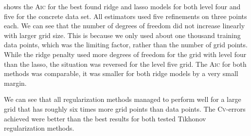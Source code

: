  shows the \textsc{Aic} for the best found ridge and lasso models for both level four and five for the concrete data set.
All estimators used five refinements on three points each.
We can see that the number of degrees of freedom did not increase linearly with
larger grid size.
This is because we only used about one thousand training data points, which was the limiting factor, rather than the number of grid points.
While the ridge penalty used more degrees of freedom for the grid with level
four than the lasso, the situation was reversed for the level five grid.
The \textsc{Aic} for both methods was comparable, it was smaller for both ridge
models by a very small margin.

We can see that all regularization methods managed to perform well for a
large grid that has roughly six times more grid points than data points.
The \textsc{Cv}-errors achieved were better than the best results for both tested
Tikhonov regularization methods.


